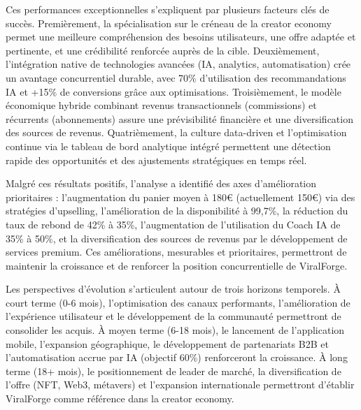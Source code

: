 Ces performances exceptionnelles s'expliquent par plusieurs facteurs clés de succès. Premièrement, la spécialisation sur le créneau de la creator economy permet une meilleure compréhension des besoins utilisateurs, une offre adaptée et pertinente, et une crédibilité renforcée auprès de la cible. Deuxièmement, l'intégration native de technologies avancées (IA, analytics, automatisation) crée un avantage concurrentiel durable, avec 70\% d'utilisation des recommandations IA et +15\% de conversions grâce aux optimisations. Troisièmement, le modèle économique hybride combinant revenus transactionnels (commissions) et récurrents (abonnements) assure une prévisibilité financière et une diversification des sources de revenus. Quatrièmement, la culture data-driven et l'optimisation continue via le tableau de bord analytique intégré permettent une détection rapide des opportunités et des ajustements stratégiques en temps réel.

Malgré ces résultats positifs, l'analyse a identifié des axes d'amélioration prioritaires : l'augmentation du panier moyen à 180€ (actuellement 150€) via des stratégies d'upselling, l'amélioration de la disponibilité à 99,7\%, la réduction du taux de rebond de 42\% à 35\%, l'augmentation de l'utilisation du Coach IA de 35\% à 50\%, et la diversification des sources de revenus par le développement de services premium. Ces améliorations, mesurables et prioritaires, permettront de maintenir la croissance et de renforcer la position concurrentielle de ViralForge.

Les perspectives d'évolution s'articulent autour de trois horizons temporels. À court terme (0-6 mois), l'optimisation des canaux performants, l'amélioration de l'expérience utilisateur et le développement de la communauté permettront de consolider les acquis. À moyen terme (6-18 mois), le lancement de l'application mobile, l'expansion géographique, le développement de partenariats B2B et l'automatisation accrue par IA (objectif 60\%) renforceront la croissance. À long terme (18+ mois), le positionnement de leader de marché, la diversification de l'offre (NFT, Web3, métavers) et l'expansion internationale permettront d'établir ViralForge comme référence dans la creator economy.

